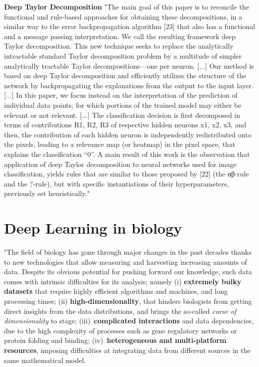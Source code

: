 		\textbf{Deep Taylor Decomposition}
			"The main goal of this paper is to reconcile the functional and rule-based approaches for obtaining these decompositions, in a similar way to the error backpropagation algorithm [23] that also has a functional and a message passing interpretation. We call the resulting framework deep Taylor decomposition. This new technique seeks to replace the analytically intractable standard Taylor decomposition problem by a multitude of simpler analytically tractable Taylor decompositions—one per neuron.
			[...]
			Our method is based on deep Taylor decomposition and efficiently utilizes the structure of the network by backpropagating the explanations from the output to the input layer.
			[...]
			In this paper, we focus instead on the interpretation of the prediction of individual data points, for which portions of the trained model may either be relevant or not relevant.
			[...]
			The classification decision is first decomposed in terms of contributions R1, R2, R3 of respective hidden neurons x1, x2, x3, and then, the contribution of each hidden neuron is independently redistributed onto the pixels, leading to a relevance map (or heatmap) in the pixel space, that explains the classification “0”.
			A main result of this work is the observation that application
			of deep Taylor decomposition to neural networks used for image classification, yields rules that are similar to those proposed by [22] (the αβ-rule and the ?-rule), but with specific instantiations of their hyperparameters, previously set heuristically." \cite{Montavon2017}


\section{Deep Learning in biology}

"The field of biology has gone through major changes in the past decades thanks to new technologies that allow measuring and harvesting increasing amounts of data. Despite its obvious potential for pushing forward our knowledge, such data comes with intrinsic difficulties for its analysis; namely (i) \textbf{extremely bulky datasets} that require highly efficient algorithms and machines, and long processing times; (ii) \textbf{high-dimensionality}, that hinders biologists from getting direct insights from the data distributions, and brings the so-called \textit{curse of dimensionality} to stage; (iii)~\textbf{complicated interactions} and data dependencies, due to the high complexity of processes such as gene regulatory networks or protein folding and binding; (iv)~\textbf{heterogeneous and multi-platform resources}, imposing difficulties at integrating data from different sources in the same mathematical model.

